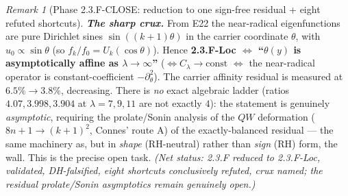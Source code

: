 \documentclass[11pt]{amsart}
\theoremstyle{definition}
\theoremstyle{remark}
\newtheorem{remark}[theorem]{Remark}
\begin{document}
\begin{remark}[Phase 2.3.F-CLOSE: reduction to one sign-free residual + eight refuted shortcuts]
\emph{\textbf{The sharp crux.}} From E22 the near-radical eigenfunctions are pure Dirichlet sines $\sin((k+1)\theta)$ in the carrier coordinate $\theta$, with $u_0\propto\sin\theta$ (so $f_k/f_0=U_k(\cos\theta)$). Hence \textbf{2.3.F-Loc $\iff$ ``$\theta(y)$ is asymptotically affine as $\lambda\to\infty$''} ($\iff C_\lambda\to\mathrm{const}$ $\iff$ the near-radical operator is constant-coefficient $-\partial_\theta^2$). The carrier affinity residual is measured at $6.5\%\to3.8\%$, decreasing. There is \emph{no} exact algebraic ladder (ratios $4.07,3.998,3.904$ at $\lambda=7,9,11$ are not exactly $4$): the statement is genuinely \emph{asymptotic}, requiring the prolate/Sonin analysis of the $QW$ deformation ($8n+1\to(k+1)^2$, Connes' route A) of the exactly-balanced residual --- the same machinery as, but in \emph{shape} (RH-neutral) rather than \emph{sign} (RH) form, the wall. This is the precise open task. \emph{(Net status: 2.3.F reduced to 2.3.F-Loc, validated, DH-falsified, eight shortcuts conclusively refuted, crux named; the residual prolate/Sonin asymptotics remain genuinely open.)}


\end{remark}
\end{document}
